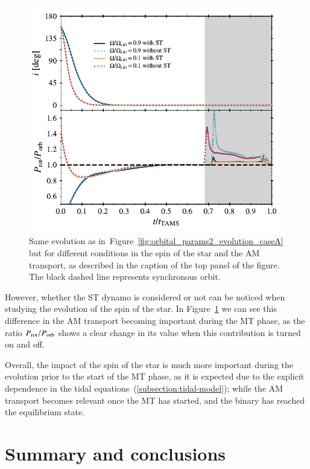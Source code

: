 \documentclass{aa}
\begin{document}
\begin{figure}
   \centering
   \includegraphics[width=\hsize]{figures/orbital_params2_evolution_caseA_appendix.pdf}
   \caption{Same evolution as in~Figure~\ref{fig:orbital_params2_evolution_caseA} but for different conditions in the spin of the star and
      the AM transport, as described in the caption of the top panel of the figure. The black dashed line represents synchronous orbit.}
   \label{fig:orbital_params2_evolution_caseA_appendix}
\end{figure}

However, whether the ST dynamo is considered or not can be noticed when studying the evolution of the spin of the star. In
Figure~\ref{fig:orbital_params2_evolution_caseA_appendix} we can see this difference in the AM transport becoming important during the MT
phase, as the ratio $P_{\rm rot}/P_{\rm orb}$ shows a clear change in its value when this contribution is turned on and off.

Overall, the impact of the spin of the star is much more important during the evolution prior to the start of the MT phase, as it is
expected due to the explicit dependence in the tidal equations~(\ref{subsection:tidal-model}); while the AM transport becomes relevant once
the MT has started, and the binary has reached the equilibrium state.

\section{Summary and conclusions}
\label{section:conclusions}
\end{document}
